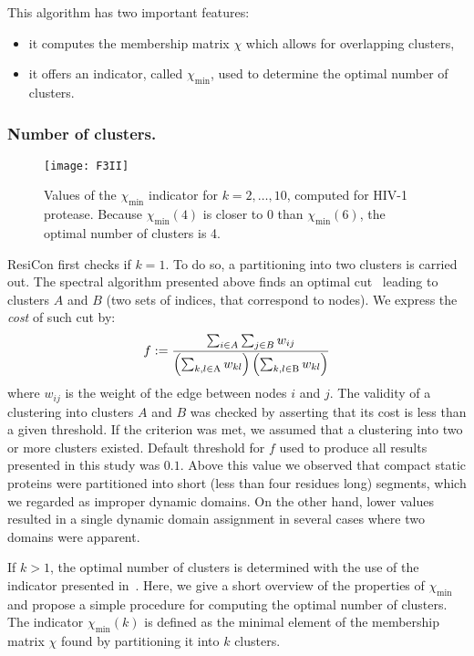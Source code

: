 \documentclass[a4paper,11pt,twoside]{book}%
\begin{document}
This algorithm has two important features:
\begin{itemize}
\item it computes the membership matrix $\chi$ which allows for overlapping clusters,
\item it offers an indicator, called $\chi_{\text{min}}$, used to determine the optimal number of clusters.
\end{itemize}

\subsubsection*{Number of clusters.}
\begin{figure}
\centering
\texttt{[image: F3II]}
\caption{
Values of the $\chi_{\text{min}}$ indicator for $k=2,\ldots,10$, computed for HIV-1 protease.
Because $\chi_{\text{min}}(4)$ is closer to 0 than $\chi_{\text{min}}(6)$, the optimal number of clusters is 4.
}
\label{minChiList}
\end{figure}
ResiCon first checks if $k=1$.
To do so, a partitioning into two clusters is carried out.
The spectral algorithm presented above finds an optimal cut~\cite{weber2004perron} leading to clusters $A$ and $B$ (two sets of indices, that correspond to nodes).
We express the \emph{cost} of such cut by:
\begin{displaymath}
f :=  \frac{\sum_{i \in A}\sum_{j \in B} w_{ij}}{\left ( \sum_{k,l \in \text{A}} w_{kl} \right ) \left ( \sum_{k,l \in \text{B}} w_{kl}   \right )} \\
\end{displaymath}
where $w_{ij}$ is the weight of the edge between nodes $i$ and $j$.
The validity of a clustering into clusters $A$ and $B$ was checked by asserting that its cost is less than a given threshold.
If the criterion was met, we assumed that a clustering into two or more clusters existed.
Default threshold for $f$ used to produce all results presented in this study was $0.1$. 
Above this value we observed that compact static proteins were partitioned into short (less than four residues long) segments, which we regarded as improper dynamic domains.
On the other hand, lower values resulted in a single dynamic domain assignment in several cases where two domains were apparent.

If $k>1$, the optimal number of clusters is determined with the use of the indicator presented in~\cite{weber2004perron}.
Here, we give a short overview of the properties of $\chi_{\text{min}}$ and propose a simple procedure for computing the optimal number of clusters.
The indicator $\chi_{\text{min}}(k)$ is defined as the minimal element of the membership matrix $\chi$ found by partitioning it into $k$ clusters.
\end{document}
